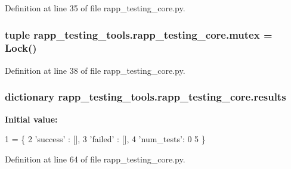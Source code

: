 Definition at line 35 of file rapp\-\_\-testing\-\_\-core.\-py.

\hypertarget{namespacerapp__testing__tools_1_1rapp__testing__core_a6aa893ae5a52f7ce64f27bc2f9063bc1}{
\subsubsection[{mutex}]{\setlength{\rightskip}{0pt plus 5cm}tuple rapp\-\_\-testing\-\_\-tools.\-rapp\-\_\-testing\-\_\-core.\-mutex = Lock()}}\label{namespacerapp__testing__tools_1_1rapp__testing__core_a6aa893ae5a52f7ce64f27bc2f9063bc1}


Definition at line 38 of file rapp\-\_\-testing\-\_\-core.\-py.

\hypertarget{namespacerapp__testing__tools_1_1rapp__testing__core_a36485787b1d8c1e042c32a84b18fdc35}{
\subsubsection[{results}]{\setlength{\rightskip}{0pt plus 5cm}dictionary rapp\-\_\-testing\-\_\-tools.\-rapp\-\_\-testing\-\_\-core.\-results}}\label{namespacerapp__testing__tools_1_1rapp__testing__core_a36485787b1d8c1e042c32a84b18fdc35}
{\bfseries Initial value\-:}
\begin{DoxyCode}
1 = \{
2     \textcolor{stringliteral}{'success'} : [],
3     \textcolor{stringliteral}{'failed'} : [],
4     \textcolor{stringliteral}{'num\_tests'}: 0
5 \}
\end{DoxyCode}


Definition at line 64 of file rapp\-\_\-testing\-\_\-core.\-py.

